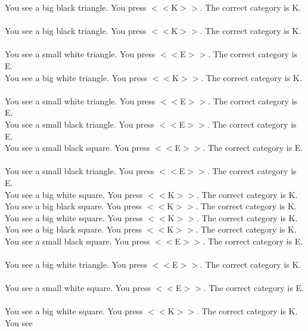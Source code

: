 \documentclass[pdflatex,sn-nature]{sn-jnl}%
\theoremstyle{thmstyleone}%
\theoremstyle{thmstyletwo}%
\theoremstyle{thmstylethree}%
\begin{document}
You see a big black triangle. You press $<<$K$>>$. The correct category is K. $~$\\ 
You see a big black triangle. You press $<<$K$>>$. The correct category is K. $~$\\ 
You see a small white triangle. You press $<<$E$>>$. The correct category is E. $~$\\ 
You see a big white triangle. You press $<<$K$>>$. The correct category is K. $~$\\ 
You see a small white triangle. You press $<<$E$>>$. The correct category is E. $~$\\ 
You see a small black triangle. You press $<<$E$>>$. The correct category is E. $~$\\ 
You see a small black square. You press $<<$E$>>$. The correct category is E. $~$\\ 
You see a small black triangle. You press $<<$E$>>$. The correct category is E. $~$\\ 
You see a big white square. You press $<<$K$>>$. The correct category is K. $~$\\ 
You see a big black square. You press $<<$K$>>$. The correct category is K. $~$\\ 
You see a big white square. You press $<<$K$>>$. The correct category is K. $~$\\ 
You see a big black square. You press $<<$K$>>$. The correct category is K. $~$\\ 
You see a small black square. You press $<<$E$>>$. The correct category is E. $~$\\ 
You see a big white triangle. You press $<<$E$>>$. The correct category is K. $~$\\ 
You see a small white square. You press $<<$E$>>$. The correct category is E. $~$\\ 
You see a big white square. You press $<<$K$>>$. The correct category is K. $~$\\ 
You see  
\end{document}
